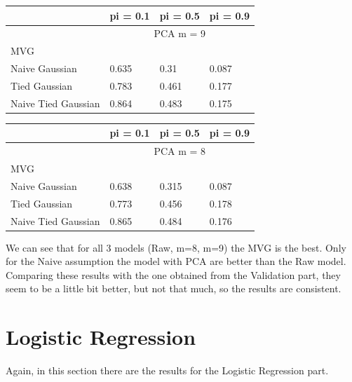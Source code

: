 \documentclass[english]{report}
\begin{document}
\begin{table}[H]
    \centering
    \begin{tabular}{@{}llll@{}}
    \toprule
                        & pi = 0.1  & pi = 0.5  & pi = 0.9 \\ \midrule
                        & \multicolumn{3}{c}{PCA m = 9} \\ \midrule
    MVG                 & \color{red}{0.569}     & \color{red}{0.272}     & \color{red}{0.082}    \\
    Naive Gaussian      & 0.635     & 0.31      & 0.087    \\
    Tied Gaussian       & 0.783     & 0.461     & 0.177    \\
    Naive Tied Gaussian & 0.864     & 0.483     & 0.175    \\ \bottomrule
    \end{tabular}
    \label{tab:MVG_PCA9_valid_eval}
\end{table}

\begin{table}[H]
    \centering
    \begin{tabular}{@{}llll@{}}
    \toprule
                        & pi = 0.1  & pi = 0.5  & pi = 0.9 \\ \midrule
                        & \multicolumn{3}{c}{PCA m = 8} \\ \midrule
    MVG                 & \color{red}{0.571}     & \color{red}{0.271}     & \color{red}{0.083}    \\
    Naive Gaussian      & 0.638     & 0.315     & 0.087    \\
    Tied Gaussian       & 0.773     & 0.456     & 0.178    \\
    Naive Tied Gaussian & 0.865     & 0.484     & 0.176    \\ \bottomrule
    \end{tabular}
    \label{tab:MVG_PCA8_valid_eval}
\end{table}

We can see that for all 3 models (Raw, m=8, m=9) the MVG is the best.
Only for the Naive assumption the model with PCA are better than the Raw model. \newline
Comparing these results with the one obtained from the Validation part, they seem to be a little bit better, but not that much, so
the results are consistent. 

\newpage

\section{Logistic Regression}
Again, in this section there are the results for the Logistic Regression part.
\end{document}
